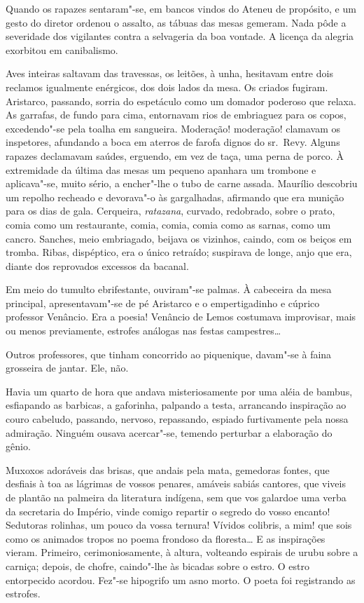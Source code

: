 Quando os rapazes sentaram"-se, em bancos vindos do Ateneu
de propósito, e um gesto do diretor ordenou o assalto, as tábuas das
mesas gemeram. Nada pôde a severidade dos vigilantes contra a
selvageria da boa vontade. A licença da alegria exorbitou em
canibalismo. 

Aves inteiras saltavam das travessas, os leitões, à unha,
hesitavam entre dois reclamos igualmente enérgicos, dos dois lados da
mesa. Os criados fugiram. Aristarco, passando, sorria do espetáculo
como um domador poderoso que relaxa. As garrafas, de fundo para cima,
entornavam rios de embriaguez para os copos, excedendo"-se pela toalha
em sangueira. Moderação! moderação! clamavam os inspetores, afundando a
boca em aterros de farofa dignos do sr.~Revy. Alguns rapazes declamavam
saúdes, erguendo, em vez de taça, uma perna de porco. À extremidade da
última das mesas um pequeno apanhara um trombone e aplicava"-se, muito
sério, a encher"-lhe o tubo de carne assada. Maurílio descobriu um
repolho recheado e devorava"-o às gargalhadas, afirmando que era
munição para os dias de gala. Cerqueira, \textit{ratazana}, curvado, redobrado,
sobre o prato, comia como um restaurante, comia, comia, comia como as
sarnas, como um cancro. Sanches, meio embriagado, beijava os vizinhos,
caindo, com os beiços em tromba. Ribas, dispéptico, era o único
retraído; suspirava de longe, anjo que era, diante dos reprovados
excessos da bacanal. 

Em meio do tumulto ebrifestante, ouviram"-se
palmas. À cabeceira da mesa principal, apresentavam"-se de pé Aristarco e
o empertigadinho e cúprico professor Venâncio. Era a poesia! Venâncio
de Lemos costumava improvisar, mais ou menos previamente, estrofes
análogas nas festas campestres\ldots{} 

Outros professores, que tinham concorrido ao piquenique, 
davam"-se à faina grosseira de jantar. Ele, não. 

Havia um quarto de hora que andava misteriosamente por uma aléia
de bambus, esfiapando as barbicas, a gaforinha, palpando a testa,
arrancando inspiração ao couro cabeludo, passando, nervoso, repassando,
espiado furtivamente pela nossa admiração. Ninguém ousava acercar"-se,
temendo perturbar a elaboração do gênio. 

Muxoxos adoráveis das brisas,
que andais pela mata, gemedoras fontes, que desfiais à toa as lágrimas
de vossos penares, amáveis sabiás cantores, que viveis de plantão na
palmeira da literatura indígena, sem que vos galardoe uma verba da
secretaria do Império, vinde comigo repartir o segredo do vosso
encanto! Sedutoras rolinhas, um pouco da vossa ternura! Vívidos
colibris, a mim! que sois como os animados tropos no poema frondoso da
floresta\ldots{} E as inspirações vieram. Primeiro, cerimoniosamente, à
altura, volteando espirais de urubu sobre a carniça; depois, de chofre,
caindo"-lhe às bicadas sobre o estro. O estro entorpecido acordou.
Fez"-se hipogrifo um asno morto. O poeta foi registrando as estrofes.

